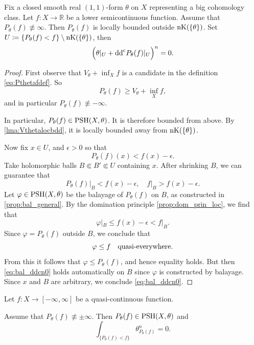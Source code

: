 \begin{lemma}\label{lma:BT_freeenvelope}
    Fix a closed smooth real $(1,1)$-form $\theta$ on $X$ representing a big cohomology class.
    Let $f\colon X\rightarrow \mathbb{R}$ be a lower semicontinuous function.
    Assume that $P_{\theta}(f)\not\equiv \infty$. Then $P_{\theta}(f)$ is locally bounded outside $\operatorname{nK}(\{\theta\})$. Set $U\coloneqq \{P_{\theta}(f)<f\}\setminus \operatorname{nK}(\{\theta\})$, then
    \begin{equation}\label{eq:bal_ddcn0}
        \Bigl(\theta|_U+\mathrm{dd}^{\mathrm{c}} P_{\theta}(f)|_U\Bigr)^n=0.
    \end{equation}
\end{lemma}
\begin{proof}
    First observe that $V_{\theta}+\inf_X f$ is a candidate in the definition \eqref{eq:Pthetafdef}. So
    \[
    P_{\theta}(f)\geq V_{\theta}+\inf_X f,
    \]
    and in particular $P_{\theta}(f)\not\equiv -\infty$.

    In particular, $P_{\theta}(f)\in \mathrm{PSH}(X,\theta)$. It is therefore bounded from above. By \cref{lma:Vthetalocbdd}, it is locally bounded away from $\operatorname{nK}(\{\theta\})$.

    Now fix $x\in U$, and $\epsilon>0$ so that
    \[
        P_{\theta}(f)(x)<f(x)-\epsilon.
    \]
    Take holomorphic balls $B\Subset B'\Subset U$ containing $x$. After shrinking $B$, we can guarantee that
    \begin{equation}\label{eq:PthetafBp_temp1}
        \left.P_{\theta}(f)\right|_{B}<f(x)-\epsilon,\quad f|_B> f(x)-\epsilon.
    \end{equation}
    Let $\varphi\in \mathrm{PSH}(X,\theta)$ be the balayage of $P_{\theta}(f)$ on $B$, as constructed in \cref{prop:bal_general}.
    By the domination principle \cref{prop:dom_prin_loc}, we find that
    \[
        \varphi|_{B}\leq f(x)-\epsilon<f|_{B}.
    \]
    Since $\varphi=P_{\theta}(f)$ outside $B$, we conclude that
    \[
        \varphi\leq f\quad \textup{quasi-everywhere}.
    \]
    From this it follows that $\varphi\leq P_{\theta}(f)$, and hence equality holds. But then \eqref{eq:bal_ddcn0} holds automatically on $B$ since $\varphi$ is constructed by balayage. Since $x$ and $B$ are arbitrary, we conclude \eqref{eq:bal_ddcn0}.
\end{proof}

\begin{theorem}\label{thm:concentration}
    Let $f\colon X\rightarrow [-\infty,\infty]$ be a quasi-continuous function.

    Assume that $P_{\theta}(f)\not\equiv \pm\infty$. Then $P_{\theta}(f)\in \mathrm{PSH}(X,\theta)$ and
    \begin{equation}\label{eq:Pthetafconc}
    \int_{\{P_{\theta}(f)<f\}} \theta_{P_{\theta}(f)}^n=0.
    \end{equation}
\end{theorem}

